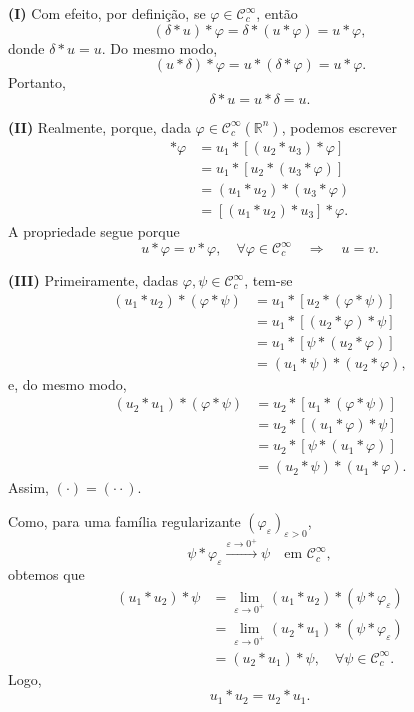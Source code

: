 \documentclass[../distribution_theory_notes.tex]{subfiles}
\begin{document}
\begin{proof*}
	\textbf{(I)} Com efeito, por definição, se \(\varphi\in \mathcal{C}_{c}^{\infty}\), então
	\[
		(\delta*u)*\varphi
		=\delta*(u*\varphi)
		=u*\varphi,
	\]
	donde \(\delta*u=u\). Do mesmo modo,
	\[
		(u*\delta)*\varphi=u*(\delta*\varphi)=u*\varphi.
	\]
	Portanto,
	\[
		\delta*u=u*\delta=u.
	\]

	\textbf{(II)} Realmente, porque, dada \(\varphi\in \mathcal{C}_{c}^{\infty}(\mathbb{R}^{n})\), podemos escrever
	\begin{align*}
		[u_{1}*(u_{2}*u_{3})]*\varphi
		 & =u_{1}*[(u_{2}*u_{3})*\varphi]  \\
		 & =u_{1}*[u_{2}*(u_{3}*\varphi)]  \\
		 & =(u_{1}*u_{2})*(u_{3}*\varphi)  \\
		 & =[(u_{1}*u_{2})*u_{3}]*\varphi.
	\end{align*}
	A propriedade segue porque
	\[
		u*\varphi=v*\varphi,
		\quad \forall \varphi\in \mathcal{C}_{c}^{\infty}
		\quad\Longrightarrow\quad u=v.
	\]

	\textbf{(III)} Primeiramente, dadas \(\varphi,\psi\in \mathcal{C}_{c}^{\infty}\), tem-se
	\begin{align*}
		(u_{1}*u_{2})*(\varphi*\psi)
		 & =u_{1}*[u_{2}*(\varphi*\psi)]                \\
		 & =u_{1}*[(u_{2}*\varphi)*\psi]                \\
		 & =u_{1}*[\psi*(u_{2}*\varphi)]                \\
		 & =(u_{1}*\psi)*(u_{2}*\varphi), \tag{$\cdot$}
	\end{align*}
	e, do mesmo modo,
	\begin{align*}
		(u_{2}*u_{1})*(\varphi*\psi)
		 & =u_{2}*[u_{1}*(\varphi*\psi)]                     \\
		 & =u_{2}*[(u_{1}*\varphi)*\psi]                     \\
		 & =u_{2}*[\psi*(u_{1}*\varphi)]                     \\
		 & =(u_{2}*\psi)*(u_{1}*\varphi). \tag{$\cdot\cdot$}
	\end{align*}
	Assim, \((\cdot)=(\cdot\cdot)\).

	Como, para uma família regularizante \((\varphi_{\varepsilon})_{\varepsilon>0}\),
	\[
		\psi*\varphi_{\varepsilon}
		\stackrel{\varepsilon\to0^{+}}{\longrightarrow}\psi
		\quad\text{em }\mathcal{C}_{c}^{\infty},
	\]
	obtemos que
	\begin{align*}
		(u_{1}*u_{2})*\psi
		 & =\lim_{\varepsilon\to0^{+}}(u_{1}*u_{2})*(\psi*\varphi_{\varepsilon}) \\
		 & =\lim_{\varepsilon\to0^{+}}(u_{2}*u_{1})*(\psi*\varphi_{\varepsilon}) \\
		 & =(u_{2}*u_{1})*\psi,
		\quad \forall \psi\in \mathcal{C}_{c}^{\infty}.
	\end{align*}
	Logo,
	\[
		u_{1}*u_{2}=u_{2}*u_{1}.
	\]


\end{proof*}
\end{document}
